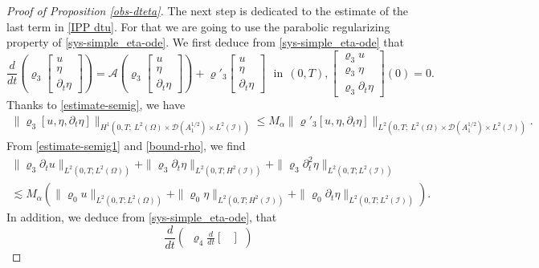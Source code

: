 \documentclass[a4paper, 12pt]{article}
\theoremstyle{plain}
\theoremstyle{definition}
\numberwithin{theorem}{section}
\numberwithin{equation}{section}
\begin{document}
{\begin{proof}[Proof of Proposition \ref{obs-dteta}]
The next step is dedicated to the estimate of the last term in \eqref{IPP dtu}.
For that we are going to use the parabolic regularizing property of \eqref{sys-simple_eta-ode}. We first deduce from \eqref{sys-simple_eta-ode} that 
\begin{equation}\label{od-e-adjoint1}
\frac{d}{dt}\left(\varrho_3\begin{bmatrix}
    u\\
    \eta\\
    \partial_t\eta
\end{bmatrix}\right)=\mathcal{A}\left(\varrho_3\begin{bmatrix}
    u\\
    \eta\\
    \partial_t\eta
\end{bmatrix}\right)+\varrho'_3\begin{bmatrix}
  u\\
  \eta\\
  \partial_t\eta
\end{bmatrix}~~~\text{in}~~(0,T),\begin{bmatrix}
  \varrho_3u\\
  \varrho_3\eta\\
  \varrho_3\partial_t\eta
\end{bmatrix}(0)=0.
\end{equation}
Thanks to \eqref{estimate-semig}, we have
\begin{align}\label{estimate-semig1}
 \|\varrho_3[u,\eta,\partial_t\eta]\|_{H^1(0,T; ~L^2(\Omega)\times\mathcal{D}(A_1^{1/2})\times L^2(\mathcal{I}))}\leq  M_\alpha\|\varrho'_3[u,\eta,\partial_t\eta]\|_{L^2(0,T; ~L^2(\Omega)\times\mathcal{D}(A_1^{1/2})\times L^2(\mathcal{I}))}.
\end{align}
From \eqref{estimate-semig1} and \eqref{bound-rho}, we find
\begin{multline}\label{estimate-rho3-rho0}
\|\varrho_3\partial_tu\|_{L^2(0,T; L^2(\Omega))}+\|\varrho_3\partial_t\eta\|_{L^2(0,T; H^2(\mathcal{I}))}+\|\varrho_3\partial^2_t\eta\|_{L^2(0,T; L^2(\mathcal{I}))}\\ \lesssim M_\alpha\left(\|\varrho_0u\|_{L^2(0,T; L^2(\Omega))}+\|\varrho_0\eta\|_{L^2(0,T; H^2(\mathcal{I}))}+\|\varrho_0\partial_t\eta\|_{L^2(0,T; L^2(\mathcal{I}))}\right).
\end{multline}
In addition, we deduce from \eqref{sys-simple_eta-ode}, that 
\begin{equation}\label{od-e-adjoint2}
\frac{d}{dt}\begin{pmatrix}\varrho_4\frac{d}{dt}\begin{bmatrix}

\end{bmatrix}
\end{pmatrix}
\end{equation}
\end{proof}}
\end{document}

